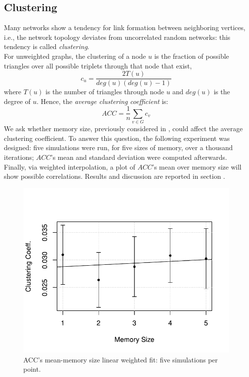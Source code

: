 \subsection{Clustering} \label{clustering}
Many networks show a tendency for link formation
between neighboring vertices, i.e., the network topology deviates
from uncorrelated random networks: this tendency is called
\textit{clustering}.\cite{clusterarticle}\\
For unweighted graphs, the clustering of a node $u$ is the fraction
of possible triangles over all possible triplets
through that node that exist,\cite{clustersite}
%
\begin{equation}
  \label{eq:clustering}
  c_u = \frac{2 T(u)}{deg(u)(deg(u)-1)}
\end{equation}
where $T(u)$ is the number of triangles through node $u$ and $deg(u)$
is the degree of $u$.
Hence, the \textit{average clustering coefficient}  is:
\begin{equation}
  \label{eq:averageclustering}
  ACC = \frac{1}{n}\sum_{v \in G} c_v
\end{equation}
We ask whether memory size, previously considered in
, could affect the average clustering coefficient.
To answer this question, the following experiment was designed:
five simulations were run, for five sizes of memory, over a thousand
iterations; $ACC$'s mean and standard deviation were computed
afterwards.\\
Finally, via weighted interpolation, a plot of $ACC$'s mean
over memory size will show possible  correlations.
Results and discussion are reported in section .
\begin{figure}[h]
  \centering
  \includegraphics[trim={0cm 0cm 0cm 1cm},clip,width=.8\columnwidth]{img/clustering.pdf}
  \caption{ACC's mean-memory size linear weighted fit: five simulations per point.\label{fig:clustering}}
\end{figure}
